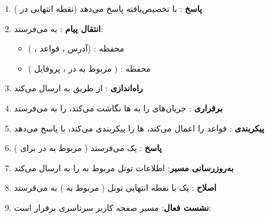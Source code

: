 \begin{enumerate}
  \begin{itemize}
  \tightlist
  \item
    ها (قواعد تشخیص بسته)، ها (قواعد اقدام ارسال)
  \item
    ها (قواعد اجرای )، ها (قواعد گزارش‌دهی مصرف)
  \item
    نقطه انتهایی تونل  ( روی  برای )
  \end{itemize}
\item
  \textbf{پاسخ }:  با  تخصیص‌یافته پاسخ می‌دهد (نقطه انتهایی  در )
\item
  \textbf{انتقال پیام }:  به  می‌فرستد:

  \begin{itemize}
  \tightlist
  \item
    محفظه :  (آدرس ، قواعد ، )
  \item
    محفظه :  ( مربوط به  در ، پروفایل )
  \end{itemize}
\item
  \textbf{راه‌اندازی }:  از طریق  به  ارسال می‌کند
\item
  \textbf{برقراری }:  جریان‌های  را به ها نگاشت می‌کند،  را به  می‌فرستد
\item
  \textbf{پیکربندی }:  قواعد  را اعمال می‌کند، ها را پیکربندی می‌کند، با  پاسخ می‌دهد
\item
  \textbf{پاسخ }:  یک  می‌فرستد ( مربوط به  در  برای )
\item
  \textbf{به‌روزرسانی مسیر}:  اطلاعات تونل  مربوط به  را به  ارسال می‌کند 
\item
  \textbf{اصلاح }:  یک  با نقطه انتهایی تونل  ( مربوط به ) به  می‌فرستد
\item
  \textbf{نشست فعال}: مسیر صفحه کاربر سرتاسری برقرار است: 
\end{enumerate}

